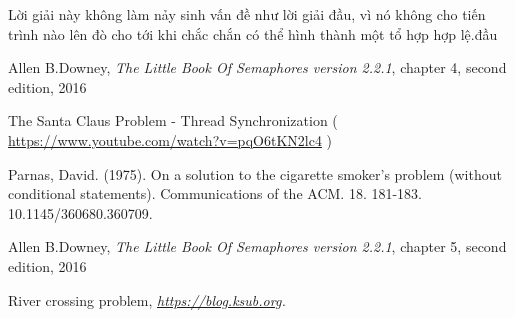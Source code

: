 \documentclass[a4paper]{article}
\begin{document}
	Lời giải này không làm nảy sinh vấn đề như lời giải đầu, vì nó không cho tiến trình nào lên đò 
	cho tới khi chắc chắn có thể hình thành một tổ hợp hợp lệ.đầu

	\pagebreak
	\begin{thebibliography}{9}
  	Allen B.Downey,
  	\textit{The Little Book Of Semaphores version 2.2.1}, chapter 4, second edition, 2016
	
    	\textit{} The Santa Claus Problem - Thread Synchronization ( \url{https://www.youtube.com/watch?v=pqO6tKN2lc4} )

	\textit{}Parnas, David. (1975). On a solution to the cigarette smoker's problem (without conditional statements). Communications of the ACM. 18. 181-183. 10.1145/360680.360709. 

  	Allen B.Downey,
	\textit{The Little Book Of Semaphores version 2.2.1}, chapter 5, second edition, 2016

	River crossing problem, 
	\textit{\href{https://blog.ksub.org}{https://blog.ksub.org}.}
	\end{thebibliography}
\end{document}
